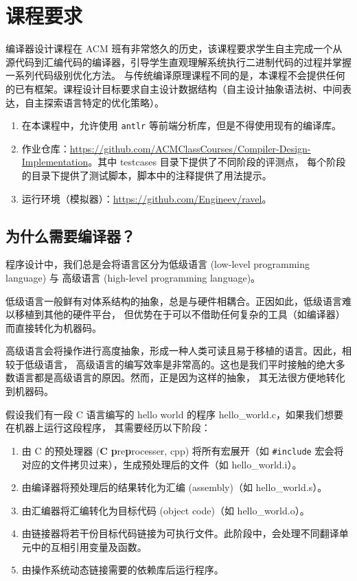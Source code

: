 \chapter{课程要求}

编译器设计课程在 ACM 班有非常悠久的历史，该课程要求学生自主完成一个从源代码到汇编代码的编译器，引导学生直观理解系统执行二进制代码的过程并掌握一系列代码级别优化方法。
与传统编译原理课程不同的是，本课程不会提供任何的已有框架。课程设计目标要求自主设计数据结构（自主设计抽象语法树、中间表达，自主探索语言特定的优化策略）。

\begin{remark}
  \begin{enumerate}
    \item 在本课程中，允许使用 \texttt{antlr} 等前端分析库，但是不得使用现有的编译库。
    \item 作业仓库：\url{https://github.com/ACMClassCourses/Compiler-Design-Implementation}。其中 testcases 目录下提供了不同阶段的评测点，
      每个阶段的目录下提供了测试脚本，脚本中的注释提供了用法提示。
    \item 运行环境（模拟器）：\url{https://github.com/Engineev/ravel}。
  \end{enumerate}
\end{remark}

\section{为什么需要编译器？}

程序设计中，我们总是会将语言区分为低级语言 (low-level programming language) 与
高级语言 (high-level programming language)。

低级语言一般鲜有对体系结构的抽象，总是与硬件相耦合。正因如此，低级语言难以移植到其他的硬件平台，
但优势在于可以不借助任何复杂的工具（如编译器）而直接转化为机器码。

高级语言会将操作进行高度抽象，形成一种人类可读且易于移植的语言。因此，相较于低级语言，
高级语言的编写效率是非常高的。这也是我们平时接触的绝大多数语言都是高级语言的原因。然而，正是因为这样的抽象，
其无法很方便地转化到机器码。

假设我们有一段 C 语言编写的 hello world 的程序 hello\_world.c，如果我们想要在机器上运行这段程序，
其需要经历以下阶段：
\begin{enumerate}
  \item 由 C 的预处理器 (\textbf{C} \textbf{p}re\textbf{p}rocesser, cpp)
    将所有宏展开（如 \texttt{\#include} 宏会将对应的文件拷贝过来），生成预处理后的文件（如 hello\_world.i）。
  \item 由编译器将预处理后的结果转化为汇编 (assembly)（如 hello\_world.s）。
  \item 由汇编器将汇编转化为目标代码 (object code)（如 hello\_world.o）。
  \item 由链接器将若干份目标代码链接为可执行文件。此阶段中，会处理不同翻译单元中的互相引用变量及函数。
  \item 由操作系统动态链接需要的依赖库后运行程序。
\end{enumerate}


